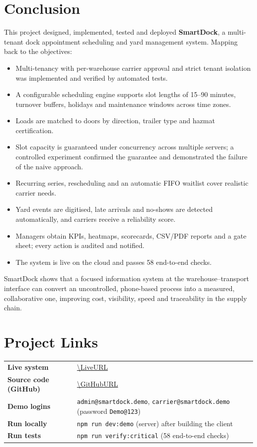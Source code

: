 \section{Conclusion}
This project designed, implemented, tested and deployed \textbf{SmartDock}, a multi-tenant dock appointment scheduling and yard management system. Mapping back to the objectives:
\begin{itemize}
  \item Multi-tenancy with per-warehouse carrier approval and strict tenant isolation was implemented and verified by automated tests.
  \item A configurable scheduling engine supports slot lengths of 15--90 minutes, turnover buffers, holidays and maintenance windows across time zones.
  \item Loads are matched to doors by direction, trailer type and hazmat certification.
  \item Slot capacity is guaranteed under concurrency across multiple servers; a controlled experiment confirmed the guarantee and demonstrated the failure of the naive approach.
  \item Recurring series, rescheduling and an automatic FIFO waitlist cover realistic carrier needs.
  \item Yard events are digitised, late arrivals and no-shows are detected automatically, and carriers receive a reliability score.
  \item Managers obtain KPIs, heatmaps, scorecards, CSV/PDF reports and a gate sheet; every action is audited and notified.
  \item The system is live on the cloud and passes 58 end-to-end checks.
\end{itemize}
SmartDock shows that a focused information system at the warehouse--transport interface can convert an uncontrolled, phone-based process into a measured, collaborative one, improving cost, visibility, speed and traceability in the supply chain.

\section{Project Links}
\begin{tabular}{@{}ll@{}}
\textbf{Live system} & \url{\LiveURL} \\
\textbf{Source code (GitHub)} & \url{\GitHubURL} \\
\textbf{Demo logins} & \texttt{admin@smartdock.demo}, \texttt{carrier@smartdock.demo} (password \texttt{Demo@123}) \\
\textbf{Run locally} & \texttt{npm run dev:demo} (server) after building the client \\
\textbf{Run tests} & \texttt{npm run verify:critical} (58 end-to-end checks) \\
\end{tabular}

